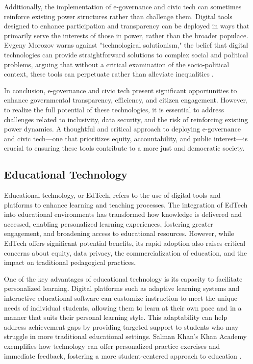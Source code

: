 \begin{refsection}
Additionally, the implementation of e-governance and civic tech can sometimes reinforce existing power structures rather than challenge them. Digital tools designed to enhance participation and transparency can be deployed in ways that primarily serve the interests of those in power, rather than the broader populace. Evgeny Morozov warns against "technological solutionism," the belief that digital technologies can provide straightforward solutions to complex social and political problems, arguing that without a critical examination of the socio-political context, these tools can perpetuate rather than alleviate inequalities \cite[pp.~129-132]{morozov2015save}.

In conclusion, e-governance and civic tech present significant opportunities to enhance governmental transparency, efficiency, and citizen engagement. However, to realize the full potential of these technologies, it is essential to address challenges related to inclusivity, data security, and the risk of reinforcing existing power dynamics. A thoughtful and critical approach to deploying e-governance and civic tech—one that prioritizes equity, accountability, and public interest—is crucial to ensuring these tools contribute to a more just and democratic society.

\subsection{Educational Technology}

Educational technology, or EdTech, refers to the use of digital tools and platforms to enhance learning and teaching processes. The integration of EdTech into educational environments has transformed how knowledge is delivered and accessed, enabling personalized learning experiences, fostering greater engagement, and broadening access to educational resources. However, while EdTech offers significant potential benefits, its rapid adoption also raises critical concerns about equity, data privacy, the commercialization of education, and the impact on traditional pedagogical practices.

One of the key advantages of educational technology is its capacity to facilitate personalized learning. Digital platforms such as adaptive learning systems and interactive educational software can customize instruction to meet the unique needs of individual students, allowing them to learn at their own pace and in a manner that suits their personal learning style. This adaptability can help address achievement gaps by providing targeted support to students who may struggle in more traditional educational settings. Salman Khan's Khan Academy exemplifies how technology can offer personalized practice exercises and immediate feedback, fostering a more student-centered approach to education \cite[pp.~38-40]{khan2013oneworld}.


\end{refsection}
